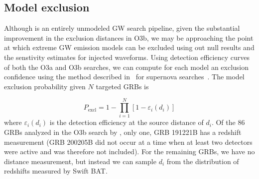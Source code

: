 %     


\subsection{Model exclusion}\label{sec:grb-o3b-models}

Although \xpip is an entirely unmodeled \ac{GW} search pipeline, given the substantial improvement in the exclusion distances in O3b, we may be approaching the point at which extreme GW emission models can be excluded using out null results and the senstivity estimates for injected waveforms.
Using detection efficiency curves of both the O3a and O3b searches, we can compute for each model an exclusion confidence using the method described in~\citet{Kalmus_2013} for supernova searches~\citep{burst_o2}.
The model exclusion probability given $N$ targeted GRBs is

\begin{equation}
	P_{\text{excl}} = 1 - \prod_{i=1}^N \left[ 1 - \varepsilon_i(d_i) \right]
\end{equation}
where $\varepsilon_i(d_i)$ is the detection efficiency at the source distance of $d_i$.
Of the 86 GRBs analyzed in the O3b search by \xpip, only one, GRB 191221B has a redshift measurement (GRB 200205B did not occur at a time when at least two detectors were active and was therefore not included).
For the remaining GRBs, we have no distance measurement, but instead we can sample $d_i$ from the distribution of redshifts measured by Swift \ac{BAT}.

